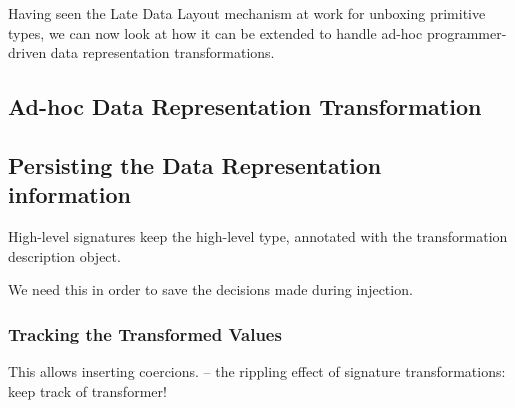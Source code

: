 Having seen the Late Data Layout mechanism at work for unboxing primitive types, we can now look at how it can be extended to handle ad-hoc programmer-driven data representation transformations.

\subsection{Ad-hoc Data Representation Transformation}


%
%

\subsection{Persisting the Data Representation information}
\label{sec:ildl:signatures}

High-level signatures keep the high-level type, annotated with the transformation description object.

We need this in order to save the decisions made during injection.

\subsubsection{Tracking the Transformed Values}
This allows inserting coercions.
 -- the rippling effect of signature transformations: keep track of transformer!

